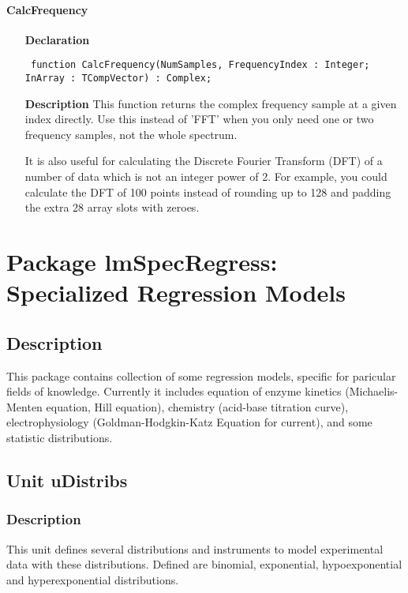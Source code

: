 \documentclass[12pt,a4paper,oneside]{report}
\newcommand{\lmath}[1]{   %
	\marginpar{\vspace{#1} 
		\begin{flushright}
			LMath
	\end{flushright} }
}
\newcommand{\declarationitem}[1]{\textbf{#1}}
\newcommand{\descriptiontitle}[1]{\textbf{#1}}
\newcommand{\code}[1]{\texttt{#1}}
\begin{document}
\subsubsection{CalcFrequency}
\label{ufft-CalcFrequency}
\begin{itemize}\item[\declarationitem{Declaration}\hfill]
	\begin{flushleft}
		\code{
			function CalcFrequency(NumSamples, FrequencyIndex : Integer; InArray : TCompVector) : Complex;}
		
	\end{flushleft}
	
	\par
	\item[\descriptiontitle{Description}]
	This function returns the complex frequency sample at a given index directly. Use this instead of 'FFT' when you only need one or two frequency samples, not the whole spectrum.
	
	It is also useful for calculating the Discrete Fourier Transform (DFT) of a number of data which is not an integer power of 2. For example, you could calculate the DFT of 100 points instead of rounding up to 128 and padding the extra 28 array slots with zeroes.
	
\end{itemize}
\chapter[Package lmSpecRegress]{Package lmSpecRegress: Specialized Regression Models}\label{package-lmSpecRegress}
\section{Description}
This package contains collection of some regression models, specific for paricular fields of knowledge. Currently it includes equation of enzyme kinetics (Michaelis-Menten equation, Hill equation), chemistry (acid-base titration curve), electrophysiology (Goldman-Hodgkin-Katz Equation for current), and some statistic distributions.
\section{Unit uDistribs}\lmath{-24pt}
\label{udistribs}
\subsection{Description}
This unit defines several distributions and instruments to model experimental data with these distributions. Defined are binomial, exponential, hypoexponential and hyperexponential distributions.
\end{document}
